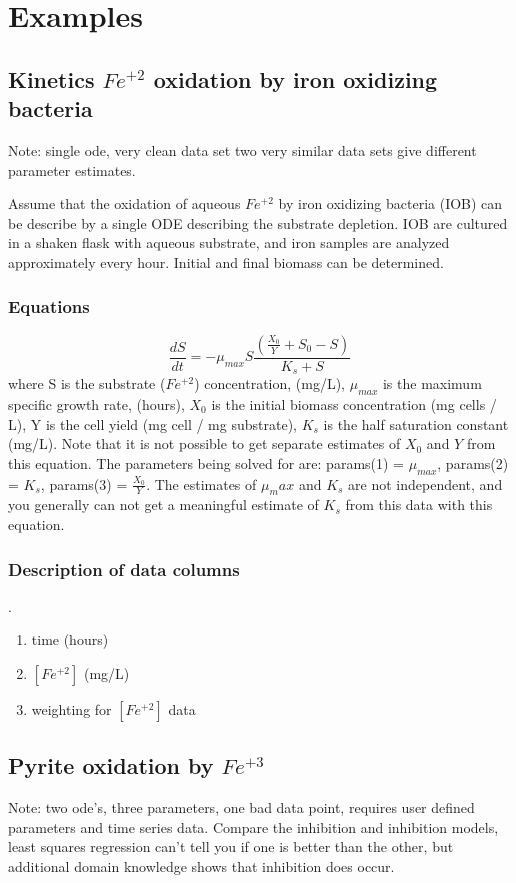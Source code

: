 \documentclass[10pt]{article}
\theoremstyle{plain}
\begin{document}
\section{Examples}

\subsection{Kinetics $Fe^{+2}$ oxidation by iron oxidizing bacteria}
Note: single ode, very clean data set two very similar data sets give
different parameter estimates.

Assume that the oxidation of aqueous $Fe^{+2}$ by iron oxidizing
bacteria (IOB) can be describe by a single ODE describing the
substrate depletion. IOB are cultured in a shaken flask with aqueous
substrate, and iron samples are analyzed approximately every
hour. Initial and final biomass can be determined.

\subsubsection{Equations}
\begin{equation}
\frac{dS}{dt} = -\mu_{max} S \frac{(\frac{X_0}{Y} + S_0 - S)}{K_s + S}
\end{equation} 
where S is the substrate ($Fe^{+2}$) concentration, (mg/L),
$\mu_{max}$ is the maximum specific growth rate, (hours), $X_0$ is the
initial biomass concentration (mg cells / L), Y is the cell yield (mg
cell / mg substrate), $K_s$ is the half saturation constant
(mg/L). Note that it is not possible to get separate estimates of
$X_0$ and $Y$ from this equation. The parameters being solved for are:
params(1) = $\mu_{max}$, params(2) = $K_s$, params(3) =
$\frac{X_0}{Y}$. The estimates of $\mu_max$ and $K_s$ are not
independent, and you generally can not get a meaningful estimate of
$K_s$ from this data with this equation.

\subsubsection{Description of data columns}.
\begin{enumerate}
\item time (hours)
\item $[Fe^{+2}]$ (mg/L)
\item weighting for $[Fe^{+2}]$ data
\end{enumerate}


\subsection{Pyrite oxidation by $Fe^{+3}$}
Note: two ode's, three parameters, one bad data point, requires user
defined parameters and time series data. Compare the inhibition and
inhibition models, least squares regression can't tell you if one is
better than the other, but additional domain knowledge shows that
inhibition does occur.
\end{document}
